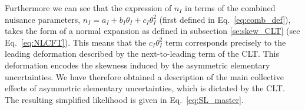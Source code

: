 \documentclass[11pt]{article}
\newcommand{\be}{\begin{equation}}
\newcommand{\ee}{\end{equation}}
\begin{document}
Furthermore we can see that the expression of $n_I$ in terms of the combined nuisance parameters, $n_I=a_I+b_{I}\theta_I+ c_I\theta_I^2$ (first defined in Eq.~\eqref{eq:comb_def}), takes the form of a normal expansion as defined  in  subsection \ref{se:skew_CLT}  (see Eq.~\eqref{eq:NLCFT}). This means that the $c_I \theta_I^2$ term  corresponds  precisely to the leading deformation  described by the next-to-leading term of the CLT.  This deformation encodes the skewness induced by the asymmetric elementary uncertainties. We have therefore obtained  a  description of the main collective effects of asymmetric elementary uncertainties, which is dictated by  the CLT. The resulting  simplified likelihood is given in Eq.~\eqref{eq:SL_master}.


%



%







\end{document}
